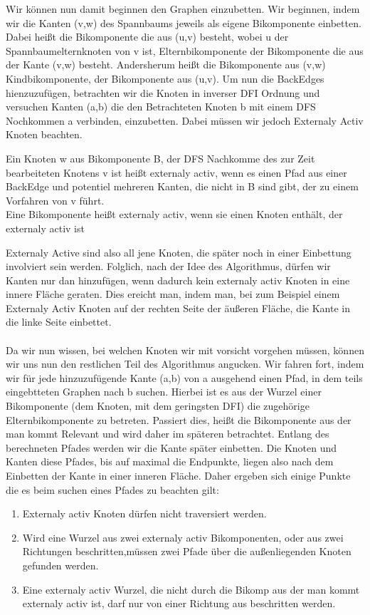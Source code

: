 \documentclass[runningheads]{llncs}
\begin{document}
    Wir können nun damit beginnen den Graphen einzubetten. Wir beginnen, indem wir die Kanten (v,w) des Spannbaums jeweils als eigene Bikomponente einbetten.
    Dabei heißt die Bikomponente die aus (u,v) besteht, wobei u der Spannbaumelternknoten von v ist, Elternbikomponente der Bikomponente die aus der Kante (v,w) besteht.
    Andersherum heißt die Bikomponente aus (v,w) Kindbikomponente, der Bikomponente aus (u,v). Um nun die BackEdges hienzuzufügen, betrachten wir die Knoten in inverser DFI Ordnung und versuchen Kanten (a,b) die den Betrachteten 
    Knoten b mit einem DFS Nochkommen a verbinden, einzubetten. Dabei müssen wir jedoch Externaly Activ Knoten beachten.
    \begin{definition}
        Ein Knoten w aus Bikomponente B, der DFS Nachkomme des zur Zeit bearbeiteten Knotens v ist heißt externaly activ,  
        wenn es einen Pfad aus einer BackEdge und potentiel mehreren Kanten, die nicht in B sind gibt, der zu einem Vorfahren von v führt.
        \\
        Eine Bikomponente heißt externaly activ, wenn sie einen Knoten enthält, der externaly activ ist
    \end{definition}
    Externaly Active sind also all jene Knoten, die später noch in einer Einbettung involviert sein werden. Folglich, nach der Idee des Algorithmus, dürfen
    wir Kanten nur dan hinzufügen, wenn dadurch kein externaly activ Knoten in eine innere Fläche geraten. Dies ereicht man, indem man, bei zum Beispiel einem Externaly Activ
    Knoten auf der rechten Seite der äußeren Fläche, die Kante in die linke Seite einbettet.
    \\
    \\
    Da wir nun wissen, bei welchen Knoten wir mit vorsicht vorgehen müssen, können wir uns nun den restlichen Teil des Algorithmus angucken. Wir fahren fort, indem wir für jede hinzuzufügende Kante
    (a,b) von a ausgehend einen Pfad, in dem teils eingebtteten Graphen nach b suchen. Hierbei ist es aus der Wurzel einer Bikomponente (dem Knoten, mit dem geringsten DFI) die
    zugehörige Elternbikomponente zu betreten. Passiert dies, heißt die Bikomponente aus der man kommt Relevant und wird daher im späteren betrachtet. Entlang des berechneten Pfades werden wir die Kante später einbetten. Die Knoten und Kanten diese Pfades, bis auf maximal die Endpunkte, liegen also nach dem Einbetten der Kante in einer inneren Fläche.
    Daher ergeben sich einige Punkte die es beim suchen eines Pfades zu beachten gilt:
    \begin{enumerate}
        \item Externaly activ Knoten dürfen nicht traversiert werden.
        \item Wird eine Wurzel aus zwei externaly activ Bikomponenten, oder aus zwei Richtungen beschritten,müssen zwei Pfade über die außenliegenden Knoten gefunden werden.
        \item Eine externaly activ Wurzel, die nicht durch die Bikomp aus der man kommt externaly activ ist, darf nur von einer Richtung aus beschritten werden.
    \end{enumerate}
\end{document}
